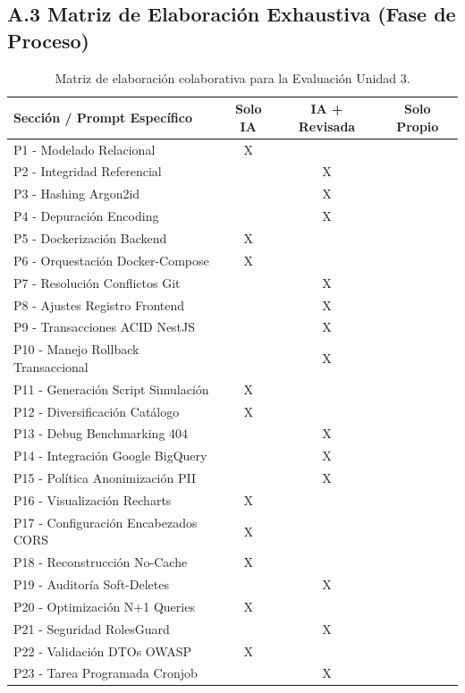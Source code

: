 \documentclass[11pt,a4paper]{article}
\begin{document}
\subsection{A.3 Matriz de Elaboración Exhaustiva (Fase de Proceso)}
\begin{table}[h]
\centering
\scriptsize
\begin{tabularx}{\textwidth}{|X|c|c|c|}
\hline
\textbf{Sección / Prompt Específico} & \textbf{Solo IA} & \textbf{IA + Revisada} & \textbf{Solo Propio} \\ \hline
P1 - Modelado Relacional & X & & \\ \hline
P2 - Integridad Referencial & & X & \\ \hline
P3 - Hashing Argon2id & & X & \\ \hline
P4 - Depuración Encoding & & X & \\ \hline
P5 - Dockerización Backend & X & & \\ \hline
P6 - Orquestación Docker-Compose & X & & \\ \hline
P7 - Resolución Conflictos Git & & X & \\ \hline
P8 - Ajustes Registro Frontend & & X & \\ \hline
P9 - Transacciones ACID NestJS & & X & \\ \hline
P10 - Manejo Rollback Transaccional & & X & \\ \hline
P11 - Generación Script Simulación & X & & \\ \hline
P12 - Diversificación Catálogo & X & & \\ \hline
P13 - Debug Benchmarking 404 & & X & \\ \hline
P14 - Integración Google BigQuery & & X & \\ \hline
P15 - Política Anonimización PII & & X & \\ \hline
P16 - Visualización Recharts & X & & \\ \hline
P17 - Configuración Encabezados CORS & X & & \\ \hline
P18 - Reconstrucción No-Cache & X & & \\ \hline
P19 - Auditoría Soft-Deletes & & X & \\ \hline
P20 - Optimización N+1 Queries & X & & \\ \hline
P21 - Seguridad RolesGuard & & X & \\ \hline
P22 - Validación DTOs OWASP & X & & \\ \hline
P23 - Tarea Programada Cronjob & & X & \\ \hline
\end{tabularx}
\caption{Matriz de elaboración colaborativa para la Evaluación Unidad 3.}
\end{table}
\end{document}
